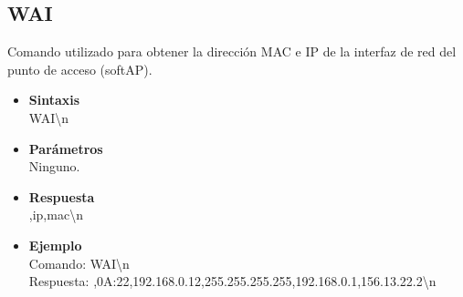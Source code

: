 \documentclass[a4paper,spanish]{article}
\begin{document}
\subsection{WAI}
Comando utilizado para obtener la dirección MAC e IP de la interfaz de red del punto de acceso (softAP).
\begin{itemize}
	\item \textbf{Sintaxis}\\
	{\ttfamily WAI\textbackslash n}
	\item \textbf{Parámetros}\\
	Ninguno.
	\item \textbf{Respuesta}\\
	{,ip,mac\textbackslash n}
	\item\textbf{Ejemplo}\\
	Comando: {\ttfamily WAI\textbackslash n}\\
	Respuesta: {,0A:22,192.168.0.12,255.255.255.255,192.168.0.1,156.13.22.2\textbackslash n}
\end{itemize}
\end{document}
